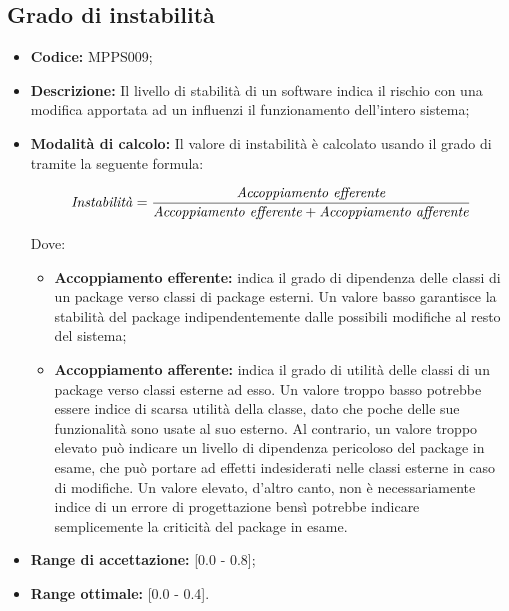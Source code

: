 \documentclass[openany,12pt,a4paper]{report}
\begin{document}
\subsection{Grado di instabilità}

\begin{itemize}
    \item \textbf{Codice:} MPPS009;
    
    \item \textbf{Descrizione:} Il livello di stabilità di un software indica il rischio con una modifica apportata ad un  influenzi il funzionamento dell'intero sistema;
    
    \item \textbf{Modalità di calcolo:} Il valore di instabilità è calcolato usando il grado di  tramite la seguente formula:
    
    \[ \textrm{\textit{Instabilità}} = \frac{\textrm{\textit{Accoppiamento efferente}}}{\textrm{\textit{Accoppiamento efferente}} + \textrm{\textit{Accoppiamento afferente}}} \]
    
    Dove:
    
    \begin{itemize}
        \item \textbf{Accoppiamento efferente:} indica il grado di dipendenza delle classi di un package verso classi di package esterni. Un valore basso garantisce la stabilità del package indipendentemente dalle possibili modifiche al resto del sistema;
        
        \item \textbf{Accoppiamento afferente:} indica il grado di utilità delle classi di un package verso classi esterne ad esso. Un valore troppo basso potrebbe essere indice di scarsa utilità della classe, dato che poche delle sue funzionalità sono usate al suo esterno. Al contrario, un valore troppo elevato può indicare un livello di dipendenza pericoloso del package in esame, che può portare ad effetti indesiderati nelle classi esterne in caso di modifiche. Un valore elevato, d'altro canto, non è necessariamente indice di un errore di progettazione bensì potrebbe indicare semplicemente la criticità del package in esame.
    \end{itemize}
    
    \item \textbf{Range di accettazione:} [0.0 - 0.8];
    \item \textbf{Range ottimale:} [0.0 - 0.4].

\end{itemize}
\end{document}
